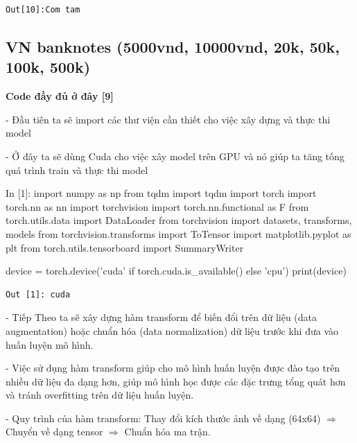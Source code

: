 \documentclass[12pt, a4paper]{article}
\begin{document}
\begin{verbatim}
Out[10]:Com tam
\end{verbatim}








\newpage
\subsection{VN banknotes (5000vnd, 10000vnd, 20k, 50k, 100k, 500k)}
\par \textbf{Code đầy đủ ở đây [9]}
\par\hspace{0cm}- Đầu tiên ta sẽ import các thư viện cần thiết cho việc xây dựng và thực thi model
\par\hspace{0cm}- Ở đây ta sẽ dùng Cuda cho việc xây model trên GPU và nó giúp ta tăng tống quá trình train và thực thi model
\begin{python}
In [1]: import numpy as np
        from tqdm import tqdm
        import torch
        import torch.nn as nn
        import torchvision
        import torch.nn.functional as F
        from torch.utils.data import DataLoader
        from torchvision import datasets, transforms, models
        from torchvision.transforms import ToTensor
        import matplotlib.pyplot as plt
        from torch.utils.tensorboard import SummaryWriter
        
        
        device = torch.device('cuda' if torch.cuda.is_available() else 'cpu')
        print(device)
\end{python}
\begin{verbatim}
Out [1]: cuda
\end{verbatim}
\par - Tiếp Theo ta sẽ xây dựng hàm transform để biến đổi trên dữ liệu (data augmentation) hoặc chuẩn hóa (data normalization) dữ liệu trước khi đưa vào huấn luyện mô hình.
\par - Việc sử dụng hàm transform giúp cho mô hình huấn luyện được đào tạo trên nhiều dữ liệu
đa dạng hơn, giúp mô hình học được các đặc trưng tổng quát hơn và tránh overfitting trên dữ liệu huấn luyện.
\par - Quy trình của hàm transform: Thay đổi kích thước ảnh về dạng (64x64) $\Rightarrow$ Chuyển về dạng tensor $\Rightarrow$ Chuẩn hóa ma trận.
\end{document}
